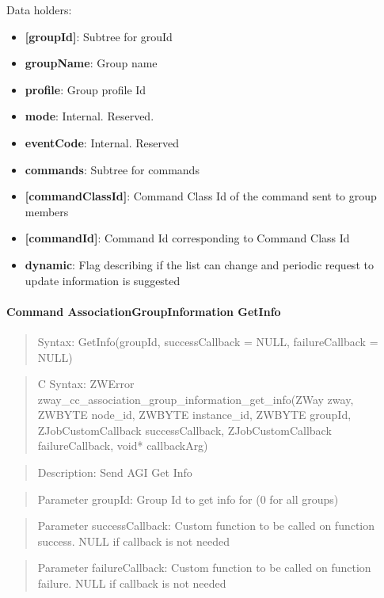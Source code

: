 \noindent
Data holders:

\begin{itemize}
\item \textbf{[groupId]}: Subtree for grouId
\item \qquad\textbf{groupName}: Group name
\item \qquad\textbf{profile}: Group profile Id
\item \qquad\textbf{mode}: Internal. Reserved.
\item \qquad\textbf{eventCode}: Internal. Reserved
\item \qquad\textbf{commands}: Subtree for commands
\item \qquad\qquad\textbf{[commandClassId]}: Command Class Id of the command sent to group members
\item \qquad\qquad\qquad\textbf{[commandId]}: Command Id corresponding to Command Class Id
\item \textbf{dynamic}: Flag describing if the list can change and periodic request to update information is suggested
\end{itemize}

\paragraph{Command AssociationGroupInformation GetInfo}
\begin{quote}Syntax: GetInfo(groupId, successCallback = NULL, failureCallback = NULL)\end{quote}
\begin{quote}C Syntax: ZWError zway\_cc\_association\_group\_information\_get\_info(ZWay zway, ZWBYTE node\_id, ZWBYTE instance\_id, ZWBYTE groupId, ZJobCustomCallback successCallback, ZJobCustomCallback failureCallback, void* callbackArg)\end{quote}
\begin{quote}Description: Send AGI Get Info\end{quote}
\begin{quote}Parameter groupId: Group Id to get info for (0 for all groups)\end{quote}
\begin{quote}Parameter successCallback: Custom function to be called on function success. NULL if callback is not needed\end{quote}
\begin{quote}Parameter failureCallback: Custom function to be called on function failure. NULL if callback is not needed\end{quote}


